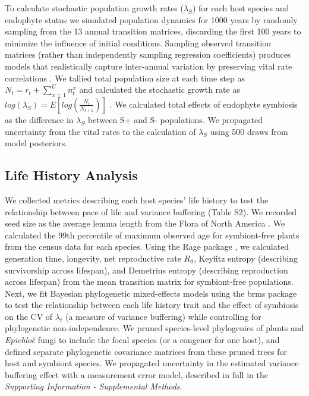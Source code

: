 \documentclass[lineno, sn-basic]{sn-jnl}%
\begin{document}
To calculate stochastic population growth rates ($\lambda_S$) for each host species and endophyte status we simulated population dynamics for 1000 years by randomly sampling from the 13 annual transition matrices, discarding the first 100 years to minimize the influence of initial conditions. 
Sampling observed transition matrices (rather than independently sampling regression coefficients) produces models that realistically capture inter-annual variation by preserving vital rate correlations \citep{metcalf2015statistical}.
We tallied total population size at each time step as  $N_{t} = r_{t} + \sum_{x=1}^{U}n^x_{t}$ and calculated the stochastic growth rate as $log(\lambda_S) = E[log(\frac{N_{t}}{N_{t+1}})]$ \citep{caswell2001matrix,rees2009integral}.
We calculated total effects of endophyte symbiosis as the difference in $\lambda_S$ between S+ and S- populations. 
We propagated uncertainty from the vital rates to the calculation of $\lambda_S$ using 500 draws from model posteriors.


\subsection*{Life History Analysis}
We collected metrics describing each host species' life history to test the relationship between pace of life and variance buffering (Table S2). 
We recorded seed size as the average lemma length from the Flora of North America \citep{FloraNAonline}. 
We calculated the 99th percentile of maximum observed age for symbiont-free plants from the census data for each species.
Using the Rage package \citep{jones2022rcompadre}, we calculated generation time, longevity, net reproductive rate $R_0$, Keyfitz entropy (describing survivorship across lifespan), and Demetrius entropy (describing reproduction across lifespan) from the mean transition matrix for symbiont-free populations.
Next, we fit Bayesian phylogenetic mixed-effects models using the brms package \citep{Burkner2017brms} to test the relationship between each life history trait and the effect of symbiosis on the CV of $\lambda_{t}$ (a measure of variance buffering) while controlling for phylogenetic non-independence.
We pruned species-level phylogenies of plants \citep{zanne2014three} and \emph{Epichlo\"{e}} fungi \citep{leuchtmann2014nomenclatural} to include the focal species (or a congener for one host), and defined separate phylogenetic covariance matrices from these pruned trees for host and symbiont species. 
We propagated uncertainty in the estimated variance buffering effect with a measurement error model, described in full in the \emph{Supporting Information - Supplemental Methods}.
\end{document}
